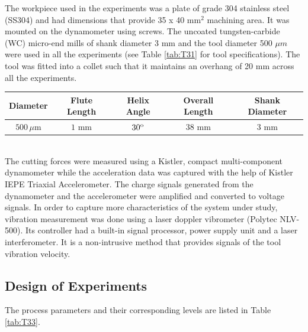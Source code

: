 \documentclass[preprint,review,12pt]{elsarticle}
\begin{document}
 The workpiece used in the experiments was a plate of grade 304 stainless steel (SS304) and had dimensions that provide 35 x 40  mm$^2$ machining area. It was mounted on the dynamometer using screws. The uncoated tungsten-carbide (WC) micro-end mills of shank diameter 3 mm and the tool diameter 500 $\mu{m}$ were used in all the experiments (see Table \ref{tab:T31} for tool specifications). The tool was fitted into a collet such that it maintains an overhang of 20 mm across all the experiments. \par

\begin{minipage}{\linewidth}
\begin{center}
 \label{tab:T31}
\begin{tabular}{ c c c c c }
	\hline
	Diameter & Flute Length & Helix Angle & Overall Length & Shank Diameter \\
	\hline\hline
 	$500\,\mu$m & $1$ mm & $30\textsuperscript{o}$ & $38$ mm & $3$ mm \\
 	\hline
\end{tabular}
\end{center}
\end{minipage} \\

 The cutting forces were measured using a Kistler, compact multi-component dynamometer while the acceleration data was captured with the help of Kistler IEPE Triaxial Accelerometer. The charge signals generated from the dynamometer and the accelerometer were amplified and converted to voltage signals. In order to capture more characteristics of the system under study, vibration measurement was done using a laser doppler vibrometer (Polytec NLV-500). Its controller had a built-in signal processor, power supply unit and a laser interferometer. It is a non-intrusive method that provides signals of the tool vibration velocity.\par

\subsection{Design of Experiments}\label{sec:sec33}
The process parameters and their corresponding levels are listed in Table \ref{tab:T33}. \par
\end{document}
